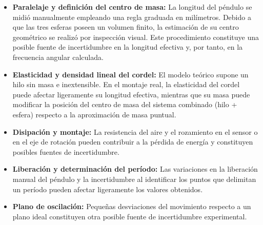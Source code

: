 \begin{itemize}
    
    \item \textbf{Paralelaje y definición del centro de masa:} La longitud del péndulo se midió manualmente empleando una regla graduada en milímetros. Debido a que las tres esferas poseen un volumen finito, la estimación de su centro geométrico se realizó por inspección visual. Este procedimiento constituye una posible fuente de incertidumbre en la longitud efectiva y, por tanto, en la frecuencia angular calculada.
    
    \item \textbf{Elasticidad y densidad lineal del cordel:} El modelo teórico supone un hilo sin masa e inextensible. En el montaje real, la elasticidad del cordel puede afectar ligeramente su longitud efectiva, mientras que su masa puede modificar la posición del centro de masa del sistema combinado (hilo + esfera) respecto a la aproximación de masa puntual.

    \item \textbf{Disipación y montaje:} La resistencia del aire y el rozamiento en el sensor o en el eje de rotación pueden contribuir a la pérdida de energía y constituyen posibles fuentes de incertidumbre.

    \item \textbf{Liberación y determinación del período:} Las variaciones en la liberación manual del péndulo y la incertidumbre al identificar los puntos que delimitan un período pueden afectar ligeramente los valores obtenidos.

    \item \textbf{Plano de oscilación:} Pequeñas desviaciones del movimiento respecto a un plano ideal constituyen otra posible fuente de incertidumbre experimental.
    
\end{itemize}
